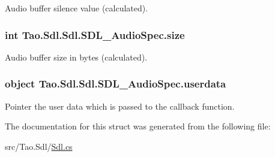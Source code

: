 Audio buffer silence value (calculated). 

\hypertarget{struct_tao_1_1_sdl_1_1_sdl_1_1_s_d_l___audio_spec_a8cd766ffb23b757b6d0db6e490d664df}{
\subsubsection[{size}]{\setlength{\rightskip}{0pt plus 5cm}int {\bf Tao.Sdl.Sdl.SDL\_\-AudioSpec.size}}}
\label{struct_tao_1_1_sdl_1_1_sdl_1_1_s_d_l___audio_spec_a8cd766ffb23b757b6d0db6e490d664df}


Audio buffer size in bytes (calculated). 

\hypertarget{struct_tao_1_1_sdl_1_1_sdl_1_1_s_d_l___audio_spec_a988e76da152a5e29ddd6c2bd17458b8c}{
\subsubsection[{userdata}]{\setlength{\rightskip}{0pt plus 5cm}object {\bf Tao.Sdl.Sdl.SDL\_\-AudioSpec.userdata}}}
\label{struct_tao_1_1_sdl_1_1_sdl_1_1_s_d_l___audio_spec_a988e76da152a5e29ddd6c2bd17458b8c}


Pointer the user data which is passed to the callback function. 



The documentation for this struct was generated from the following file:\begin{DoxyCompactItemize}
\item 
src/Tao.Sdl/\hyperlink{_sdl_8cs}{Sdl.cs}\end{DoxyCompactItemize}
